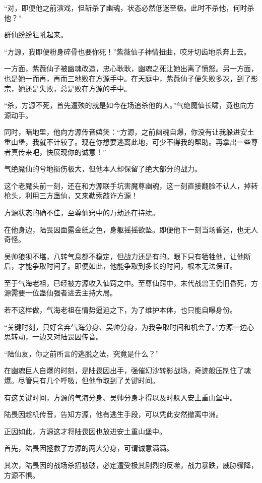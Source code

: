 \begin{this_body}
“对，即便他之前演戏，但斩杀了幽魂，状态必然低迷至极。此时不杀他，何时杀他？”

群仙纷纷狂吼起来。

“方源，我即便粉身碎骨也要你死！”紫薇仙子神情扭曲，咬牙切齿地杀奔上去。

一方面，紫薇仙子被幽魂改造，忠心耿耿，幽魂之死让她出离了愤怒。另一方面，也是她一而再，再而三地败在方源手中。在天庭中，紫薇仙子便失败多次，到了影宗，她还是失败，总是败在方源的手中。

“杀，方源不死，首先遭殃的就是如今在场追杀他的人。”气绝魔仙长啸，竟也向方源动手。

同时，暗地里，他向方源传音嬉笑：“方源，之前幽魂自爆，你没有让我躲进安土重山堡，我就不计较了。现在你想要逃离此地，可少不得我的帮助。再拿出一些尊者真传来吧，快展现你的诚意！”

气绝魔仙的兮地损伤极大，但他本人却保留了绝大部分的战力。

这个老魔头前一刻，还在和方源联手坑害魔尊幽魂，这一刻直接翻脸不认人，掉转枪头，利用三方蛊仙，又来勒索敲诈方源！

方源状态的确不佳，至尊仙窍中的万劫还在持续。

在他身边，陆畏因面露金纸之色，身躯摇摇欲坠。即便他下一刻当场昏迷，也无人奇怪。

吴帅狼狈不堪，八转气息都不稳定，但战力还是有的。眼下只有牺牲他，让他断后，才能争取时间了。即便如此，他能争取到多长的时间，根本无法保证。

至于气海老祖，已经被方源收入仙窍之中。至尊仙窍中，末代战兽王仍旧昏死，方源需要一位蛊仙强者进去主持大局。

若不这样做，气海老祖在情势逼迫之下，为了维护本体，也只能自曝身份。

“关键时刻，只好舍弃气海分身、吴帅分身，为我争取时间和机会了。”方源一边心思转动，一边又对陆畏因传音。

“陆仙友，你之前所言的逃脱之法，究竟是什么？”

在幽魂巨人自爆的时刻，是陆畏因出手，强催幻沙转影战场，奇迹般压制住了魂爆。尽管只有几个呼吸，但他争取到了关键时间。

有这关键时间，方源的气海分身、吴帅分身才得以及时躲入安土重山堡中。

陆畏因趁机传音，告知方源，他有逃生手段，可以凭此安然撤离中洲。

正因如此，方源这才将陆畏因也放进安土重山堡中。

首先，陆畏因拯救了方源的两大分身，可谓诚意满满。

其次，陆畏因的战场杀招被破，必定遭受极其剧烈的反噬，战力暴跌，威胁骤降，方源不惧。

\end{this_body}

